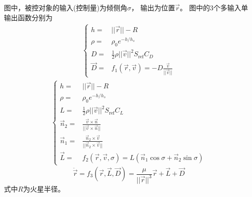 图中，被控对象的输入(控制量)为倾侧角$\sigma$，
输出为位置$\vec{r}$。
图中的3个多输入单输出函数分别为
\begin{align}\left\{\begin{aligned}
    h =& ||\vec{r}||-R \\
    \rho =& \rho_0e^{-h/h_s} \\
    D =& \frac{1}{2}\rho||\vec{v}||^2S_{\text{ref}}C_D \\
    \vec{D} =& f_1(\vec{r},\vec{v}) = -D\frac{\vec{v}}{||\vec{v}||}
\end{aligned}\right.\end{align}
\begin{align}\left\{\begin{aligned}
    h =& ||\vec{r}||-R \\
    \rho =& \rho_0e^{-h/h_s} \\
    L =& \frac{1}{2}\rho||\vec{v}||^2S_{\text{ref}}C_L \\
    \vec{n}_2 =& \frac{\vec{v}\times\vec{n}}{||\vec{v}\times\vec{n}||} \\
    \vec{n}_1 =& \frac{\vec{n}_2\times\vec{v}}{||\vec{n}_2\times\vec{v}||} \\
    \vec{L} =& f_2(\vec{r},\vec{v},\sigma) = L(\vec{n}_1\cos\sigma + \vec{n}_2\sin\sigma)
\end{aligned}\right.\end{align}
\begin{equation}
    \ddot{\vec{r}} = f_3(\vec{r},\vec{L},\vec{D}) = \frac{\mu}{||\vec{r}||^3}\vec{r}+\vec{L}+\vec{D}
\end{equation}
式中$R$为火星半径。


